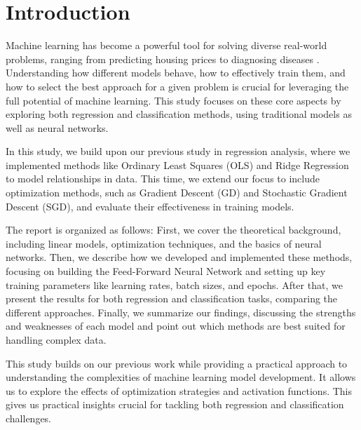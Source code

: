 \documentclass{article}
\newcommand{\0}{\mathbf{0}}
\newcommand{\1}{\mathbf{1}}
\begin{document}
\section{Introduction}


Machine learning has become a powerful tool for solving diverse real-world problems, ranging from predicting housing prices to diagnosing diseases \cite{charotamine2024}. Understanding how different models behave, how to effectively train them, and how to select the best approach for a given problem is crucial for leveraging the full potential of machine learning. This study focuses on these core aspects by exploring both regression and classification methods, using traditional models as well as neural networks. 


In this study, we build upon our previous study in regression analysis, where we implemented methods like Ordinary Least Squares (OLS) and Ridge Regression to model relationships in data. This time, we extend our focus to include optimization methods, such as Gradient Descent (GD) and Stochastic Gradient Descent (SGD), and evaluate their effectiveness in training models. %

The report is organized as follows: First, we cover the theoretical background, including linear models, optimization techniques, and the basics of neural networks. Then, we describe how we developed and implemented these methods, focusing on building the Feed-Forward Neural Network and setting up key training parameters like learning rates, batch sizes, and epochs. After that, we present the results for both regression and classification tasks, comparing the different approaches. Finally, we summarize our findings, discussing the strengths and weaknesses of each model and point out which methods are best suited for handling complex data.

This study builds on our previous work while providing a practical approach to understanding the complexities of machine learning model development. It allows us to explore the effects of optimization strategies and activation functions. This gives us practical insights crucial for tackling both regression and classification challenges.
\end{document}
